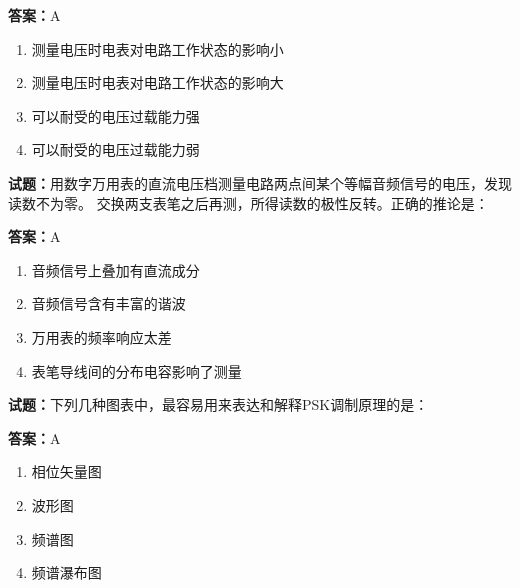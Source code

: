 \documentclass{ctexbook}
\begin{document}
\textbf{答案：}A 

\begin{enumerate}[leftmargin=3em]
  \item 测量电压时电表对电路工作状态的影响小 

  \item 测量电压时电表对电路工作状态的影响大 

  \item 可以耐受的电压过载能力强 

  \item 可以耐受的电压过载能力弱 

\end{enumerate}





\vspace{1em}

\textbf{试题：}用数字万用表的直流电压档测量电路两点间某个等幅音频信号的电压，发现读数不为零。
交换两支表笔之后再测，所得读数的极性反转。正确的推论是： 

\textbf{答案：}A 

\begin{enumerate}[leftmargin=3em]
  \item 音频信号上叠加有直流成分 

  \item 音频信号含有丰富的谐波 

  \item 万用表的频率响应太差 

  \item 表笔导线间的分布电容影响了测量 

\end{enumerate}





\vspace{1em}

\textbf{试题：}下列几种图表中，最容易用来表达和解释PSK调制原理的是： 

\textbf{答案：}A 

\begin{enumerate}[leftmargin=3em]
  \item 相位矢量图 

  \item 波形图 

  \item 频谱图 

  \item 频谱瀑布图 

\end{enumerate}
\end{document}

